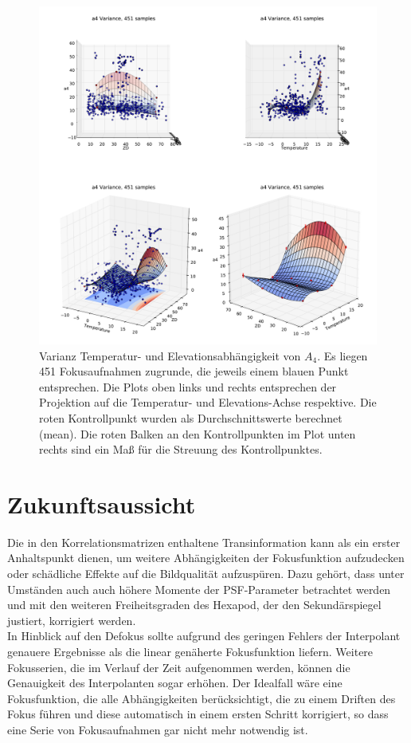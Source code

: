 \begin{figure}[H]
	\centering
	\includegraphics[scale=.48]{psf_surf/a4_var.pdf}
	\caption[Varianz Temperatur- und Elevationsabhängigkeit von $A_4$]{Varianz Temperatur- und Elevationsabhängigkeit von $A_4$. Es liegen 451 Fokusaufnahmen zugrunde, die jeweils einem blauen Punkt entsprechen. Die Plots oben links und rechts entsprechen der Projektion auf die Temperatur- und Elevations-Achse respektive. Die roten Kontrollpunkt wurden als Durchschnittswerte berechnet (mean). Die roten Balken an den Kontrollpunkten im Plot unten rechts sind ein Maß für die Streuung des Kontrollpunktes. }
    \label{psf_surf_a4_var_inline}
\end{figure}

\section{Zukunftsaussicht}
Die in den Korrelationsmatrizen enthaltene Transinformation kann als ein erster Anhaltspunkt dienen, um weitere Abhängigkeiten der Fokusfunktion aufzudecken oder schädliche Effekte auf die Bildqualität aufzuspüren. Dazu gehört, dass unter Umständen auch auch höhere Momente der PSF-Parameter betrachtet werden und mit den weiteren Freiheitsgraden des Hexapod, der den Sekundärspiegel justiert, korrigiert werden.\\
In Hinblick auf den Defokus sollte aufgrund des geringen Fehlers der Interpolant genauere Ergebnisse als die linear genäherte Fokusfunktion liefern. Weitere Fokusserien, die im Verlauf der Zeit aufgenommen werden, können die Genauigkeit des Interpolanten sogar erhöhen. Der Idealfall wäre eine Fokusfunktion, die alle Abhängigkeiten berücksichtigt, die zu einem Driften des Fokus führen und diese automatisch in einem ersten Schritt korrigiert, so dass eine Serie von Fokusaufnahmen gar nicht mehr notwendig ist.
